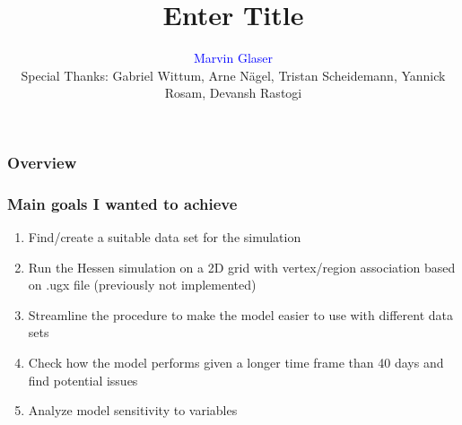 \documentclass{beamer}
\title[Other thing]{Enter Title}
\author{\textcolor{blue}{Marvin Glaser\\}
\vspace{2mm}\footnotesize{Special Thanks: Gabriel Wittum, Arne N\"agel, Tristan Scheidemann, Yannick Rosam, Devansh Rastogi}} %
\institute[G-CSC] %
{
Goethe Universtiy Frankfurt - Center for Scientific Computing \\ %
\medskip
}
\begin{document}



\begin{frame}
\frametitle{Overview} 
\tableofcontents 
\end{frame}



\begin{frame}
	\frametitle{Main goals I wanted to achieve}
	\begin{enumerate}[$\bullet$]
		\item Find/create a suitable data set for the simulation
		\item Run the Hessen simulation on a 2D grid with vertex/region association based on .ugx file (previously not implemented)
		\item Streamline the procedure to make the model easier to use with different data sets
		\item Check how the model performs given a longer time frame than 40 days and find potential issues
		\item Analyze model sensitivity to variables
	\end{enumerate}
\end{frame}
\end{document}
